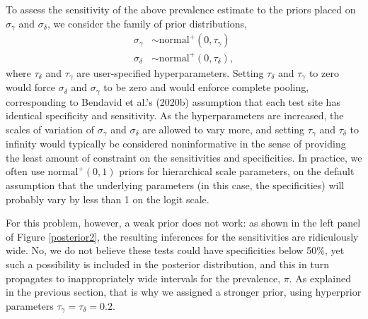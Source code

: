 \documentclass[11pt]{article}
\begin{document}
To assess the sensitivity of the above prevalence estimate to the priors
placed on $\sigma_{\gamma}$ and $\sigma_{\delta}$, we consider the family of prior distributions,
\begin{align*}
  \sigma_{\gamma} & \sim \mbox{normal}^+(0, \tau_{\gamma})\\
\sigma_{\delta} & \sim  \mbox{normal}^+(0, \tau_{\delta}),
\end{align*}
where $\tau_{\delta} $ and $\tau_{\gamma} $ are user-specified
hyperparameters. Setting  $\tau_{\delta}$ and
$\tau_{\gamma}$ to zero would force $\sigma_{\delta}$ and
$\sigma_{\gamma}$ to be zero and would enforce complete pooling,
corresponding to Bendavid et al.'s (2020b) assumption that each test site has identical
specificity  and sensitivity. As the hyperparameters are increased, the
scales of variation of $\sigma_{\gamma}$ and $\sigma_{\delta}$ are
allowed to vary more, and setting $\tau_{\gamma}$ and $\tau_{\delta}$ to infinity would typically be considered noninformative in the sense of providing the least amount of constraint on the sensitivities and specificities.  In practice, we often use $\mbox{normal}^+(0,1)$ priors for hierarchical scale parameters, on the default assumption that the underlying parameters (in this case, the specificities) will probably vary by less than 1 on the logit scale.

For this problem, however, a weak prior does not work:  as shown in the left panel of Figure \ref{posterior2}, the resulting inferences for the sensitivities are ridiculously wide. No, we do not believe these tests could have specificities below 50\%, yet such a possibility is included in the posterior distribution, and this in turn propagates to inappropriately wide intervals for the prevalence, $\pi$.  As explained in the previous section, that is why we assigned a stronger prior, using hyperprior parameters $\tau_{\gamma}=\tau_{\delta}=0.2$.
\end{document}
